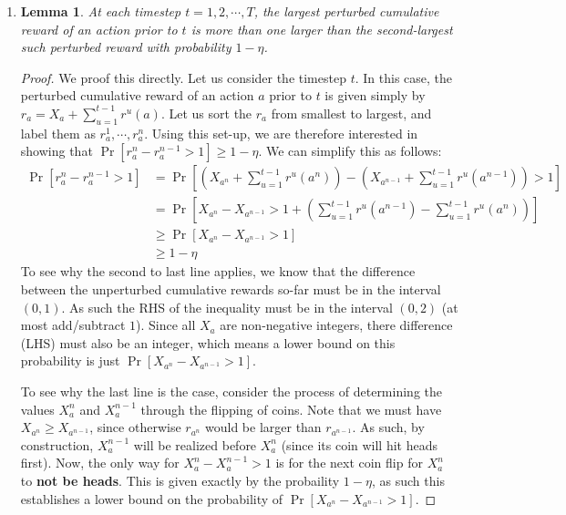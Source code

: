 \documentclass[12pt]{exam}
\newtheorem{lemma}[theorem]{Lemma}
\newcommand{\Q}[1]{\question{\large{\textbf{#1}}}}
\begin{document}
\begin{questions}
\newpage
\Q{Problem 14}
\begin{solution}
  \begin{enumerate}[label=(\alph*)]
    \item 
      \begin{lemma}
        At each timestep $t = 1, 2, \cdots, T$, the largest perturbed cumulative reward of an action prior to $t$ is more than one larger than the second-largest such perturbed reward with probability $1 - \eta$.
      \end{lemma}
      \begin{proof}
        We proof this directly. Let us consider the timestep $t$. In this case, the perturbed cumulative reward of an action $a$ prior to $t$ is given simply by $r_a = X_a + \sum_{u=1}^{t-1} r^u(a)$. Let us sort the $r_a$ from smallest to largest, and label them as $r_a^1, \cdots, r_a^n$. 
        Using this set-up, we are therefore interested in showing that $\Pr[r_a^n - r_a^{n-1} > 1] \geq 1 - \eta$. We can simplify this as follows:
        \begin{align*}
          \Pr[r_a^n - r_a^{n-1} > 1] &= \Pr[( X_{a^n} + \sum_{u=1}^{t-1} r^u(a^n)) - ( X_{a^{n-1}} + \sum_{u=1}^{t-1} r^u(a^{n-1})) > 1] \tag{Definition} \\
          &= \Pr[X_{a^n} - X_{a^{n-1}} > 1 + (\sum_{u=1}^{t-1} r^u(a^{n-1}) - \sum_{u=1}^{t-1} r^u(a^n))] \tag{Re-arranging terms} \\
          &\geq \Pr[X_{a^n} - X_{a^{n-1}} > 1] \tag{See below} \\
          &\geq 1 - \eta \tag{See below}
        \end{align*}
        To see why the second to last line applies, we know that the difference between the unperturbed cumulative rewards so-far must be in the interval $(0,1)$. As such the RHS of the inequality must be in the interval $(0, 2)$ (at most add/subtract $1$). Since all $X_a$ are non-negative integers, there difference (LHS) must also be an integer, which means a lower bound on this probability is just $\Pr[X_{a^n} - X_{a^{n-1}} > 1]$. 

        To see why the last line is the case, consider the process of determining the values $X_a^n$ and $X_a^{n-1}$ through the flipping of coins. Note that we must have $X_{a^n} \geq X_{a^{n-1}}$, since otherwise $r_{a^n}$ would be larger than $r_{a^{n-1}}$. As such, by construction, $X_a^{n-1}$ will be realized before $X_a^{n}$ (since its coin will hit heads first). Now, the only way for $X_a^{n} - X_a^{n-1} > 1$ is for the next coin flip for $X_a^{n}$ to \textbf{not be heads}. This is given exactly by the probaility $1 - \eta$, as such this establishes a lower bound on the probability of $\Pr[X_{a^n} - X_{a^{n-1}} > 1]$.
      \end{proof}


\end{enumerate}
\end{solution}
\end{questions}
\end{document}
